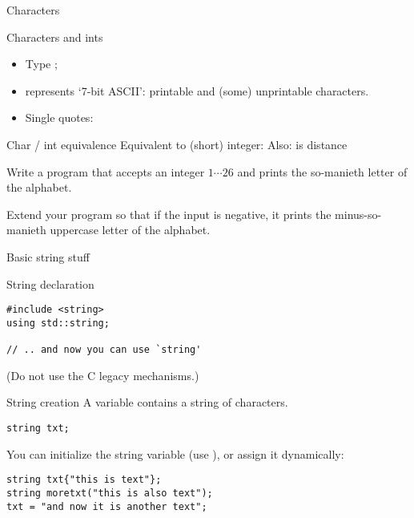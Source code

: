 
 {Characters}

\begin{block}{Characters and ints}
  \label{sl:chardef}
  \begin{itemize}
  \item Type ;
  \item represents `7-bit ASCII': printable and (some) unprintable
    characters.
  \item Single quotes: 
  \end{itemize}
\end{block}

\begin{block}{Char / int equivalence}
  \label{sl:int-char}
  Equivalent to (short) integer:
  Also:  is distance 
\end{block}

\begin{exercise}
  \label{ex:print-ichar}
  Write a program that accepts an integer $1\cdots26$ and prints the
  so-manieth letter of the alphabet.

  Extend your program so that if the input is negative, it prints the
  minus-so-manieth uppercase letter of the alphabet.
\end{exercise}

 {Basic string stuff}
\label{sec:string}

\begin{block}{String declaration}
  \label{sl:string-declare}
\begin{verbatim}
#include <string>
using std::string;

// .. and now you can use `string'
\end{verbatim}
(Do not use the C legacy mechanisms.)
\end{block}

\begin{block}{String creation}
  \label{sl:string-create}
  A  variable contains a string of characters.
\begin{verbatim}
string txt;
\end{verbatim}
You can initialize the string variable (use ), or assign it dynamically:
\begin{verbatim}
string txt{"this is text"};
string moretxt("this is also text");
txt = "and now it is another text";
\end{verbatim}
\end{block}


